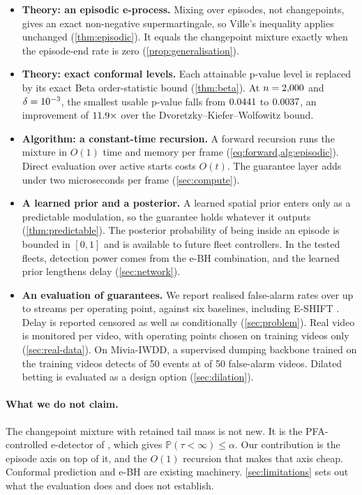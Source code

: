 \begin{itemize}
\item \textbf{Theory: an episodic e-process.} Mixing over episodes, not
      changepoints, gives an exact non-negative supermartingale, so Ville's
      inequality applies unchanged (\cref{thm:episodic}). It equals the changepoint
      mixture exactly when the episode-end rate is zero (\cref{prop:generalisation}).

\item \textbf{Theory: exact conformal levels.} Each attainable p-value level is
      replaced by its exact Beta order-statistic bound (\cref{thm:beta}). At
      $n=2{,}000$ and $\delta=10^{-3}$, the smallest usable p-value falls from
      $0.0441$ to $0.0037$, an improvement of $11.9\times$ over
      the Dvoretzky--Kiefer--Wolfowitz bound.

\item \textbf{Algorithm: a constant-time recursion.} A forward recursion runs the
      mixture in $O(1)$ time and memory per frame (\cref{eq:forward,alg:episodic}).
      Direct evaluation over active starts costs $O(t)$. The guarantee layer adds
      under two microseconds per frame (\cref{sec:compute}).

\item \textbf{A learned prior and a posterior.} A learned
      spatial prior enters only as a predictable modulation, so the guarantee holds
      whatever it outputs (\cref{thm:predictable}). The posterior probability of
      being inside an episode is bounded in $[0,1]$ and is available to future fleet
      controllers. In the tested fleets, detection power comes from the e-BH
      combination, and the learned prior lengthens delay (\cref{sec:network}).

\item \textbf{An evaluation of guarantees.} We report realised false-alarm rates
      over up to \ExpOneReps{} streams per operating point, against six baselines,
      including E-SHIFT \citep{khan2026eshift}. Delay is reported censored as well as
      conditionally (\cref{sec:problem}). Real video is monitored per video, with operating points chosen on training videos only (\cref{sec:real-data}). On Mivia-IWDD, a supervised dumping backbone trained on the training videos detects \RThreeSupSEDetk{} of 50 events at \RThreeSupSEFAk{} of 50 false-alarm videos.
      Dilated betting is evaluated as a design option (\cref{sec:dilation}).
\end{itemize}

\paragraph{What we do not claim.}
The changepoint mixture with retained tail mass is not new. It is the
PFA-controlled e-detector of \citet{saha2026nonpartitioned}, which gives
$\mathbb{P}(\tau<\infty)\le\alpha$. Our contribution is the episode axis on top of
it, and the $O(1)$ recursion that makes that axis cheap. Conformal prediction and
e-BH are existing machinery. \cref{sec:limitations} sets out what the evaluation
does and does not establish.
